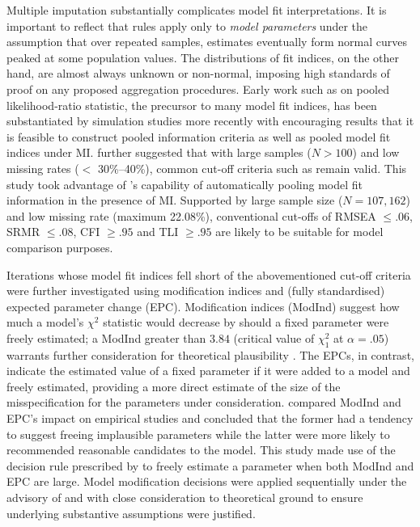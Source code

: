 \documentclass[a4paper,11pt,UKenglish,twoside,openright]{report}\usepackage[]{graphicx}\usepackage[]{color}
\begin{document}
Multiple imputation substantially complicates model fit interpretations. It is important to reflect that  rules apply only to \emph{model parameters} under the assumption that over repeated samples, estimates eventually form normal curves peaked at some population values. The distributions of fit indices, on the other hand, are almost always unknown or non-normal, imposing high standards of proof on any proposed aggregation procedures. Early work such as \textcite{meng:1992} on pooled likelihood-ratio statistic, the precursor to many model fit indices, has been substantiated by simulation studies more recently with encouraging results that it is feasible to construct pooled information criteria \parencite{claeskens:2008} as well as pooled model fit indices \parencite{asparouhov:2010a} under MI. \textcite{enders:2018} further suggested that with large samples ($N>100$) and low missing rates ($<$ 30\%--40\%), common cut-off criteria such as \textcite{hu:1999} remain valid. This study took advantage of \CM's capability of automatically pooling model fit information in the presence of MI. Supported by large sample size ($N=107,162$) and low missing rate (maximum 22.08\%), conventional cut-offs of RMSEA $\leq .06$, SRMR $\leq .08$, CFI $\geq .95$ and TLI $\geq .95$ are likely to be suitable for model comparison purposes.

Iterations whose model fit indices fell short of the abovementioned cut-off criteria were further investigated using modification indices and (fully standardised) expected parameter change (EPC). Modification indices (ModInd) suggest how much a model's $\chi^2$ statistic would decrease by should a fixed parameter were freely estimated; a ModInd greater than $3.84$ (critical value of $\chi^2_1$ at $\alpha=.05$) warrants further consideration for theoretical plausibility \parencite{whittaker:2012}. The EPCs, in contrast, indicate the estimated value of a fixed parameter if it were added to a model and freely estimated, providing a more direct estimate of the size of the misspecification for the parameters under consideration. \textcite{kaplan:1989} compared ModInd and EPC's impact on empirical studies and concluded that the former had a tendency to suggest freeing implausible parameters while the latter were more likely to recommended reasonable candidates to the model. This study made use of the decision rule prescribed by \textcite{saris:1987} to freely estimate a parameter when both ModInd and EPC are large. Model modification decisions were applied sequentially under the advisory of \textcite{maccallum:1992} and with close consideration to theoretical ground to ensure underlying substantive assumptions were justified.
\end{document}
